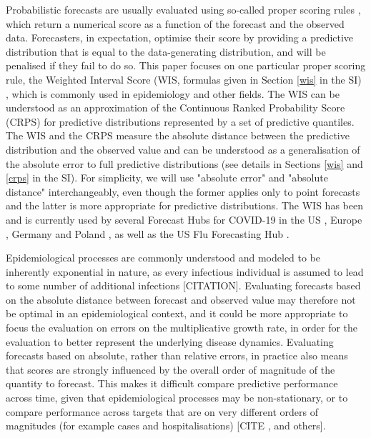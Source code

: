 \documentclass{article}
\begin{document}
Probabilistic forecasts \citep{heldProbabilisticForecastingInfectious2017} are usually evaluated using so-called proper scoring rules \citep{gneitingStrictlyProperScoring2007}, which return a numerical score as a function of the forecast and the observed data. Forecasters, in expectation, optimise their score by providing a predictive distribution that is equal to the data-generating distribution, and will be penalised if they fail to do so. 
This paper focuses on one particular proper scoring rule, the Weighted Interval Score (WIS, formulas given in Section \ref{wis} in the SI) \citep{bracherEvaluatingEpidemicForecasts2021}, which is commonly used in epidemiology and other fields. The WIS can be understood as an approximation of the Continuous Ranked Probability Score (CRPS) \citep{gneitingStrictlyProperScoring2007} for predictive distributions represented by a set of predictive quantiles. The WIS and the CRPS measure the absolute distance between the predictive distribution and the observed value and can be understood as a generalisation of the absolute error to full predictive distributions (see details in Sections \ref{wis} and \ref{crps} in the SI). For simplicity, we will use "absolute error" and "absolute distance" interchangeably, even though the former applies only to point forecasts and the latter is more appropriate for predictive distributions. 
The WIS has been and is currently used by several Forecast Hubs for COVID-19 in the US \citep{cramerCOVID19ForecastHub2020, cramerEvaluationIndividualEnsemble2021}, Europe \citep{sherrattPredictivePerformanceMultimodel2022}, Germany and Poland \citep{bracherShorttermForecastingCOVID192021, bracherNationalSubnationalShortterm2021}, as well as the US Flu Forecasting Hub \citep{CdcepiFlusightforecastdata2022}. 

Epidemiological processes are commonly understood and modeled to be inherently exponential in nature, as every infectious individual is assumed to lead to some number of additional infections [CITATION]. 
Evaluating forecasts based on the absolute distance between forecast and observed value may therefore not be optimal in an epidemiological context, and it could be more appropriate to focus the evaluation on errors on the multiplicative growth rate, in order for the evaluation to better represent the underlying disease dynamics. Evaluating forecasts based on absolute, rather than relative errors, in practice also means that scores are strongly influenced by the overall order of magnitude of the quantity to forecast. This makes it difficult compare predictive performance across time, given that epidemiological processes may be non-stationary, or to compare performance across targets that are on very different orders of magnitudes (for example cases and hospitalisations) [CITE \citep{sherrattPredictivePerformanceMultimodel2022}, and others]. 
\end{document}
